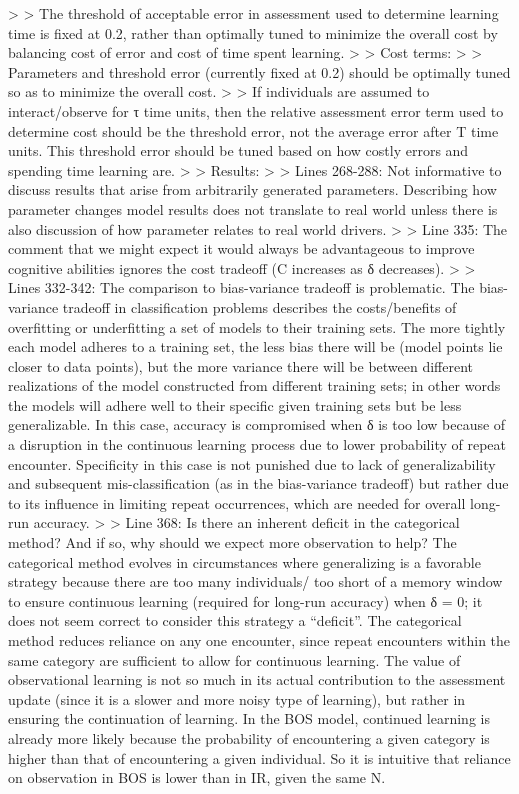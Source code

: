 >
> The threshold of acceptable error in assessment used to determine learning time is fixed at 0.2, rather than optimally tuned to minimize the overall cost by balancing cost of error and cost of time spent learning.
>
> Cost terms:
>
> Parameters  and threshold error (currently fixed at 0.2) should be optimally tuned so as to minimize the overall cost. %
>
> If individuals are assumed to interact/observe for τ time units, then the relative assessment error term used to determine cost should be the threshold error, not the average error after T time units. This threshold error should be tuned based on how costly errors and spending time learning are.
>
> Results:
>
> Lines 268-288: Not informative to discuss results that arise from arbitrarily generated parameters. Describing how parameter changes model results does not translate to real world unless there is also discussion of how parameter relates to real world drivers.
>
> Line 335: The comment that we might expect it would always be advantageous to improve cognitive abilities ignores the cost tradeoff (C increases as δ decreases).
>
> Lines 332-342: The comparison to bias-variance tradeoff is problematic. The bias-variance tradeoff in classification problems describes the costs/benefits of overfitting or underfitting a set of models to their training sets. The more tightly each model adheres to a training set, the less bias there will be (model points lie closer to data points), but the more variance there will be between different realizations of the model constructed from different training sets; in other words the models will adhere well to their specific given training sets but be less generalizable.  In this case, accuracy is compromised when δ is too low because of a disruption in the continuous learning process due to lower probability of repeat encounter. Specificity in this case is not punished due to lack of generalizability and subsequent mis-classification (as in the bias-variance tradeoff) but rather due to its influence in limiting repeat occurrences, which are needed for overall long-run accuracy.
>
> Line 368: Is there an inherent deficit in the categorical method? And if so, why should we expect more observation to help? The categorical method evolves in circumstances where generalizing is a favorable strategy because there are too many individuals/ too short of a memory window to ensure continuous learning (required for long-run accuracy) when δ = 0; it does not seem correct to consider this strategy a “deficit”. The categorical method reduces reliance on any one encounter, since repeat encounters within the same category are sufficient to allow for continuous learning.  The value of observational learning is not so much in its actual contribution to the assessment update (since it is a slower and more noisy type of learning), but rather in ensuring the continuation of learning. In the BOS model, continued learning is already more likely because the probability of encountering a given category is higher than that of encountering a given individual. So it is intuitive that reliance on observation in BOS is lower than in IR, given the same N.
